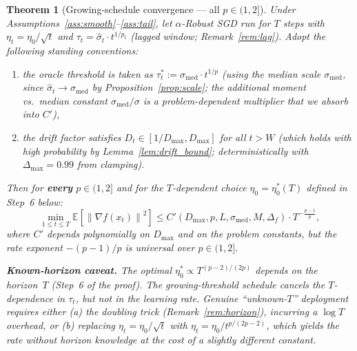 \documentclass[11pt]{article}
\newtheorem{theorem}{Theorem}
\theoremstyle{definition}
\newcommand{\E}{\mathbb{E}}
\newcommand{\norm}[1]{\left\| #1 \right\|}
\newcommand{\phat}{\hat{p}}
\newcommand{\shat}{\hat{\sigma}}
\begin{document}
\begin{theorem}[{Growing-schedule convergence --- all $p \in (1, 2]$}]\label{thm:growing}
Under Assumptions~\ref{ass:smooth}--\ref{ass:tail}, let $\alpha$-Robust SGD
run for $T$ steps with $\eta_t = \eta_0/\sqrt{t}$ and
$\tau_t = \shat_t \cdot t^{1/\phat_t}$ (lagged window;
Remark~\ref{rem:lag}). Adopt the following standing conventions:
\begin{enumerate}[label=\textup{(}\roman*\textup{)},noitemsep,leftmargin=*]
  \item the oracle threshold is taken as
    $\tau_t^{*} := \sigma_{\mathrm{med}} \cdot t^{1/p}$ (using the median
    scale $\sigma_{\mathrm{med}}$, since $\shat_t \to \sigma_{\mathrm{med}}$
    by Proposition~\ref{prop:scale}; the additional moment vs.\ median
    constant $\sigma_{\mathrm{med}}/\sigma$ is a problem-dependent
    multiplier that we absorb into $C'$),
  \item the drift factor satisfies $D_t \in [1/D_{\max}, D_{\max}]$ for all
    $t > W$ (which holds with high probability by Lemma~\ref{lem:drift_bound};
    deterministically with $\Delta_{\max} = 0.99$ from clamping).
\end{enumerate}

\medskip
Then for \textbf{every} $p \in (1, 2]$ and for the
$T$-dependent choice $\eta_0 = \eta_0^{*}(T)$ defined in Step~6 below:
\begin{equation}\label{eq:growing_main}
  \min_{1 \leq t \leq T}\E\!\left[\norm{\nabla f(x_t)}^2\right]
  \leq C'(D_{\max}, p, L, \sigma_{\mathrm{med}}, M, \Delta_f) \cdot T^{-\frac{p-1}{p}},
\end{equation}
where $C'$ depends polynomially on $D_{\max}$ and on the problem constants,
but the rate exponent $-(p-1)/p$ is universal over $p \in (1, 2]$.

\medskip
\textbf{Known-horizon caveat.} The optimal $\eta_0^{*} \propto T^{(p-2)/(2p)}$
depends on the horizon~$T$ (Step~6 of the proof). The growing-threshold
schedule \emph{cancels} the $T$-dependence in $\tau_t$, but \emph{not} in
the learning rate. Genuine ``unknown-$T$'' deployment requires either
\textup{(a)} the doubling trick (Remark~\ref{rem:horizon}), incurring a
$\log T$ overhead, or \textup{(b)} replacing $\eta_t = \eta_0/\sqrt t$ with
$\eta_t = \eta_0/t^{p/(2p-2)}$, which yields the rate without horizon
knowledge at the cost of a slightly different constant.
\end{theorem}
\end{document}
